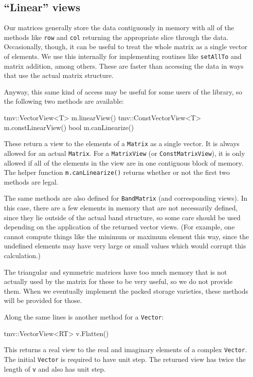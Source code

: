 \documentclass[twoside,letterpaper,11pt]{article}
\renewcommand{\tt}[1]{{\lstinline {#1}}}
\begin{document}
\subsection{``Linear'' views}
\label{linearviews}

Our matrices generally store the data contiguously in memory with all of the 
methods like \tt{row} and \tt{col} returning the appropriate slice through the
data.  Occasionally, though, it can be useful to treat the whole matrix
as a single vector of elements.  We use this internally for implementing routines
like \tt{setAllTo} and matrix addition, among others.  These are faster than
accessing the data in ways that use the actual matrix structure.

Anyway, this same kind of access may be useful for some users of the library, 
so the following two methods are available:
\begin{tmvcode}
tmv::VectorView<T> m.linearView()
tmv::ConstVectorView<T> m.constLinearView()
bool m.canLinearize()
\end{tmvcode}
These return a view to the elements of a \tt{Matrix} as a single vector.  
It is always allowed for an actual \tt{Matrix}.  For a \tt{MatrixView} 
(or \tt{ConstMatrixView}), it is only allowed if all of the elements in the 
view are in one contiguous block of memory.  The helper function 
\tt{m.canLinearize()} returns whether or not the first two methods are legal.

The same methods are also defined for \tt{BandMatrix} (and corresponding views).
In this case, there are a few elements in memory that are not necessarily
defined, since they lie outside of the actual band structure, so some care
should be used depending on the application of the returned vector views.  
(For example, one cannot compute things like the
minimum or maximum element this way, since the undefined elements may
have very large or small values which would corrupt this calculation.)

The triangular and symmetric matrices have too much memory that is not
actually used by the matrix for these to be very useful, so we do not provide them.
When we eventually implement the packed storage varieties, these methods will
be provided for those.

Along the same lines is another method for a \tt{Vector}:
\begin{tmvcode}
tmv::VectorView<RT> v.Flatten()
\end{tmvcode}
This returns a real view to the real and imaginary elements of a complex \tt{Vector}. 
The initial \tt{Vector} is required to have unit step.  The returned view has twice the 
length of \tt{v} and also has unit step.
\end{document}
